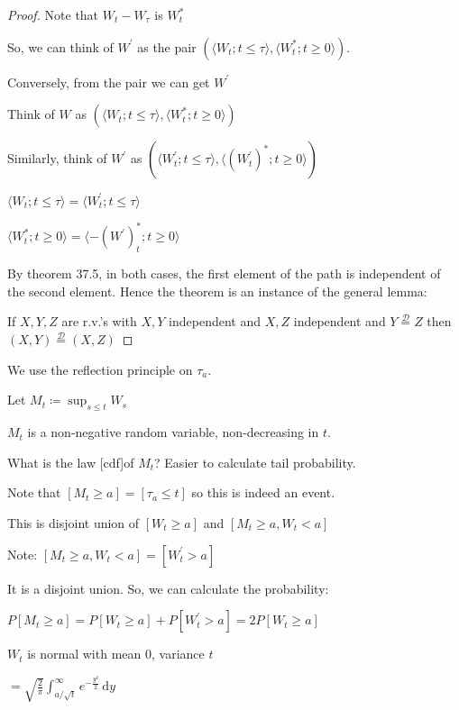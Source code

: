 \documentclass{article}
\theoremstyle{definition}
\begin{document}
\begin{proof}

    Note that \(W_t - W_{\tau}\) is \(W_t^{\ast}\)  

    So, we can think of \(W^{\prime}\) as the pair \((\langle W_t ; t \leq \tau \rangle, \langle W_t^{\ast} ; t\geq 0 \rangle  )\).

    Conversely, from the pair we can get \(W^{\prime}\) 

    Think of \(W\) as \((\langle W_t ; t \leq \tau \rangle, \langle W_t^{\ast} ; t \geq 0 \rangle  )\) 

    Similarly, think of \(W^{\prime}\) as \((\langle W_t^{\prime} ; t \leq \tau \rangle, \langle (W^{\prime} _t)^{\ast} ; t\geq 0 \rangle  )\)  

    \(\langle W_t ; t \leq \tau \rangle = \langle W_t^{\prime} ; t \leq \tau \rangle\)

    \(\langle W_t^{\ast} ; t\geq 0 \rangle = \langle -(W^{\prime})^{\ast}_t ; t \geq 0 \rangle  \) 

    By theorem 37.5, in both cases, the first element of the path is independent of the second element. Hence the theorem is an instance of the general lemma:

    If \(X,Y,Z\) are r.v.'s with \(X,Y\) independent and \(X,Z\) independent and \(Y \overset{\mathscr{D}}{=} Z \) then \((X,Y) \overset{\mathscr{D}}{=} (X,Z) \)
    
\end{proof}

We use the reflection principle on \(\tau_a\).

Let \(M_t \coloneqq \sup_{s \leq t} W_s\)

\(M_t\) is a non-negative random variable, non-decreasing in \(t\).

What is the law [cdf]of \(M_t\)? Easier to calculate tail probability.

Note that \([M_t \geq a] = [\tau_a\leq t]\) so this is indeed an event.

This is disjoint union of \([W_t \geq a]\) and \([M_t \geq a, W_t < a]\)

Note: \([M_t \geq a, W_t < a] = [W_t^{\prime} > a]\) 

It is a disjoint union. So, we can calculate the probability:

\(P[M_t \geq a] = P[W_t \geq a] + P[W_t^{\prime} > a] = 2 P[W_t \geq a]\) 

\(W_t\) is normal with mean \(0\), variance \(t\)

\(= \sqrt{\frac{2}{\pi}} \int_{a / \sqrt{t} }^{\infty} e^{-\frac{y^2}{2}} \,\mathrm{d}y\) 
\end{document}
